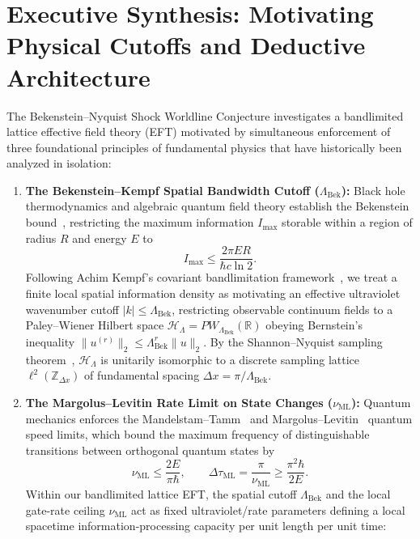 \documentclass[11pt,a4paper]{article}
\theoremstyle{definition}
\begin{document}
\section*{Executive Synthesis: Motivating Physical Cutoffs and Deductive Architecture}
The Bekenstein--Nyquist Shock Worldline Conjecture investigates a bandlimited lattice effective field theory (EFT) motivated by simultaneous enforcement of three foundational principles of fundamental physics that have historically been analyzed in isolation:
\begin{enumerate}
\item \textbf{The Bekenstein--Kempf Spatial Bandwidth Cutoff ($\Lambda_{\text{Bek}}$):} Black hole thermodynamics and algebraic quantum field theory establish the Bekenstein bound~\cite{bekenstein1981,casini2008}, restricting the maximum information $I_{\max}$ storable within a region of radius $R$ and energy $E$ to
\begin{equation}
I_{\max} \le \frac{2\pi E R}{\hbar c \ln 2}.
\end{equation}
Following Achim Kempf's covariant bandlimitation framework~\cite{kempf2000,kempf2004,pye2015}, we treat a finite local spatial information density as motivating an effective ultraviolet wavenumber cutoff $|k| \le \Lambda_{\text{Bek}}$, restricting observable continuum fields to a Paley--Wiener Hilbert space $\mathcal{H}_{\Lambda} = PW_{\Lambda_{\text{Bek}}}(\mathbb{R})$ obeying Bernstein's inequality $\|u^{(r)}\|_2 \le \Lambda_{\text{Bek}}^r \|u\|_2$. By the Shannon--Nyquist sampling theorem~\cite{shannon1949}, $\mathcal{H}_{\Lambda}$ is unitarily isomorphic to a discrete sampling lattice $\ell^2(\mathbb{Z}_{\Delta x})$ of fundamental spacing $\Delta x = \pi / \Lambda_{\text{Bek}}$.
\item \textbf{The Margolus--Levitin Rate Limit on State Changes ($\nu_{\text{ML}}$):} Quantum mechanics enforces the Mandelstam--Tamm~\cite{mandelstam1945} and Margolus--Levitin~\cite{margolus1998,lloyd2000} quantum speed limits, which bound the maximum frequency of distinguishable transitions between orthogonal quantum states by
\begin{equation}
\nu_{\text{ML}} \le \frac{2E}{\pi \hbar}, \qquad \Delta\tau_{\text{ML}} = \frac{\pi}{\nu_{\text{ML}}} \ge \frac{\pi^2 \hbar}{2E}.
\end{equation}
Within our bandlimited lattice EFT, the spatial cutoff $\Lambda_{\text{Bek}}$ and the local gate-rate ceiling $\nu_{\text{ML}}$ act as fixed ultraviolet/rate parameters defining a local spacetime information-processing capacity per unit length per unit time:

\end{enumerate}
\end{document}
